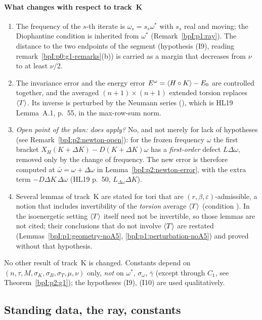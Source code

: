 \paragraph{What changes with respect to track~K}
\begin{enumerate}[label=(\arabic*)]
\item The frequency of the $s$-th iterate is $\omega_s=s_s\omega^*$ with $s_s$ real and moving; the Diophantine condition
  is inherited from $\omega^*$ (Remark~\ref{bpI:p1:ray}). The distance to the two endpoints of the segment
  (hypothesis (I9), reading remark~\ref{bpI:p0:g1-remarks}(b)) is carried as a margin that decreases from $\nu$ to at least $\nu/2$.
\item The invariance error and the energy error $E^\omega=\langle H\circ K\rangle-E_0$ are controlled together, and
  the averaged $(n+1)\times(n+1)$ extended torsion replaces $\langle T\rangle$. Its inverse is perturbed by the Neumann series
  (), which is HL19 Lemma~A.1, p.~55, in the max-row-sum norm.
\item \emph{Open point of the plan: does  apply?} No, and not merely for lack of hypotheses
  (see Remark~\ref{bpI:p2:newton-open}): for the frozen frequency $\omega$ the first bracket $X_H(K+\Delta K)-D(K+\Delta K)\omega$
  has a \emph{first-order} defect $L\Delta\omega$, removed only by the change of frequency. The new error is therefore
  computed at $\bar\omega=\omega+\Delta\omega$ in Lemma~\ref{bpI:p2:newton-error}, with the extra term $-D\Delta K\,\Delta\omega$
  (HL19 p.~50, $L_{\Delta\omega}\Delta K$).
\item Several lemmas of track~K are stated for tori that are $(r,\beta,\varepsilon)$-admissible, a notion that includes
  invertibility of the \emph{torsion} average $\langle T\rangle$ (condition ). In the isoenergetic setting $\langle T\rangle$ itself
  need not be invertible, so those lemmas are not cited; their conclusions that do not involve $\langle T\rangle$ are restated
  (Lemmas~\ref{bpI:p1:geometry-noA5}, \ref{bpI:p1:perturbation-noA5}) and proved without that hypothesis.
\end{enumerate}
No other result of track~K is changed. Constants depend on $(n,\tau,M,\sigma_K,\sigma_B,\sigma_T,\mu,\nu)$ only, \emph{not} on
$\omega^*$, $\sigma_\omega$, $\bar\gamma$ (except through $C_1$, see Theorem~\ref{bpI:p2:g1}); the hypotheses (I9), (I10) are
used qualitatively.

\subsection{Standing data, the ray, constants}\label{bpI:p2:sec-setting}

